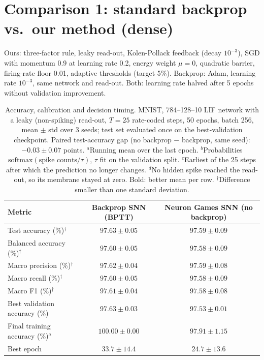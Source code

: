 \documentclass{article}
\begin{document}
\clearpage
\section*{Comparison 1: standard backprop vs.\ our method (dense)}

Ours: three-factor rule, leaky read-out, Kolen-Pollack feedback (decay $10^{-3}$), SGD with momentum 0.9 at
learning rate 0.2, energy weight $\mu = 0$, quadratic barrier, firing-rate floor 0.01, adaptive thresholds
(target 5\%). Backprop: Adam, learning rate $10^{-3}$, same network and read-out. Both: learning rate halved after
5 epochs without validation improvement.

\begin{table}[H]
\centering
\small
\caption{Accuracy, calibration and decision timing. MNIST, 784--128--10 LIF network with a leaky (non-spiking) read-out, $T=25$ rate-coded steps, 50 epochs, batch 256, mean $\pm$ std over 3 seeds; test set evaluated once on the best-validation checkpoint. Paired test-accuracy gap (no backprop $-$ backprop, same seed): $-0.03 \pm 0.07$ points. $^a$Running mean over the last epoch. $^b$Probabilities $\mathrm{softmax}(\text{spike counts}/\tau)$, $\tau$ fit on the validation split. $^c$Earliest of the 25 steps after which the prediction no longer changes. $^d$No hidden spike reached the read-out, so its membrane stayed at zero. Bold: better mean per row. $^\dagger$Difference smaller than one standard deviation.}
\label{tab:t1-accuracy}
\begin{tabular}{lcc}
\toprule
Metric & Backprop SNN (BPTT) & Neuron Games SNN (no backprop) \\
\midrule
Test accuracy (\%)$^\dagger$ & $\boldsymbol{97.63 \pm 0.05}$ & $97.59 \pm 0.09$ \\
Balanced accuracy (\%)$^\dagger$ & $\boldsymbol{97.60 \pm 0.05}$ & $97.58 \pm 0.09$ \\
Macro precision (\%)$^\dagger$ & $\boldsymbol{97.62 \pm 0.04}$ & $97.59 \pm 0.08$ \\
Macro recall (\%)$^\dagger$ & $\boldsymbol{97.60 \pm 0.05}$ & $97.58 \pm 0.09$ \\
Macro F1 (\%)$^\dagger$ & $\boldsymbol{97.61 \pm 0.04}$ & $97.58 \pm 0.08$ \\
Best validation accuracy (\%) & $\boldsymbol{97.63 \pm 0.03}$ & $97.53 \pm 0.01$ \\
Final training accuracy (\%)$^a$ & $100.00 \pm 0.00$ & $97.91 \pm 1.15$ \\
Best epoch & $33.7 \pm 14.4$ & $24.7 \pm 13.6$ \\

\end{tabular}
\end{table}
\end{document}
